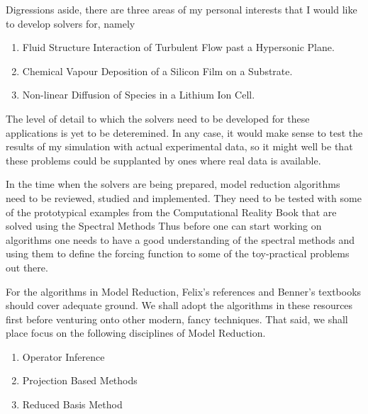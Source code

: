 \documentclass{article}
\begin{document}
Digressions aside, there are three areas of my personal interests that I would like to develop solvers for, namely
\begin{enumerate}
    \item Fluid Structure Interaction of Turbulent Flow past a Hypersonic Plane.
    \item Chemical Vapour Deposition of a Silicon Film on a Substrate.
    \item Non-linear Diffusion of Species in a Lithium Ion Cell.
\end{enumerate}

The level of detail to which the solvers need to be developed for these applications is yet to be deteremined.
In any case, it would make sense to test the results of my simulation with actual experimental data, so it might well be that these problems could be supplanted by ones where real data is available.

In the time when the solvers are being prepared, model reduction algorithms need to be reviewed, studied and implemented.
They need to be tested with some of the prototypical examples from the Computational Reality Book that are solved using the Spectral Methods
Thus before one can start working on algorithms one needs to have a good understanding of the spectral methods and using them to define the forcing function to some of the toy-practical problems out there.

For the algorithms in Model Reduction, Felix's references and Benner's textbooks should cover adequate ground. We shall adopt the algorithms in these resources first before venturing onto other modern, fancy techniques.
That said, we shall place focus on the following disciplines of Model Reduction.
\begin{enumerate}
    \item Operator Inference
    \item Projection Based Methods
    \item Reduced Basis Method
\end{enumerate}
\end{document}
